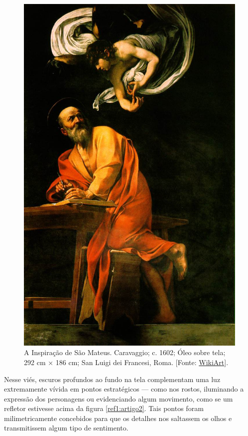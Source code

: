\begin{multicols}{2}
\begin{figure}[H]
	\centering
	\includegraphics[width=0.8\linewidth]{Figuras/Artigo2/m2.jpg}
	\protect\caption{A Inspiração de São Mateus. Caravaggio; c. 1602; Óleo sobre tela; 292 cm × 186 cm; San Luigi dei Francesi, Roma. [Fonte: \href{https://www.wikiart.org/pt/caravaggio}{WikiArt}].}
	\label{fig:m2}
\end{figure}

Nesse viés, escuros profundos ao fundo na tela complementam uma luz extremamente vívida em pontos  estratégicos — como nos rostos, iluminando a expressão dos personagens ou evidenciando algum movimento, como se um refletor estivesse acima da figura \ref{ref1:artigo2}. Tais pontos foram milimetricamente concebidos para que os detalhes nos saltassem os olhos e transmitissem algum tipo de sentimento.  
	

\end{multicols}
